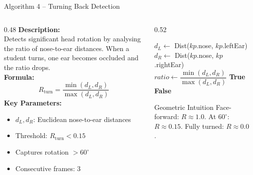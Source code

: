 \documentclass{beamer}
\begin{document}
\begin{frame}{Algorithm 4 -- Turning Back Detection}
\begin{columns}
\begin{column}{0.48\textwidth}
\footnotesize
\textbf{Description:}\\
Detects significant head rotation by analysing the ratio of nose-to-ear distances. When a student turns, one ear becomes occluded and the ratio drops.\\[0.3cm]
\textbf{Formula:}
\[
R_{\text{turn}} = \frac{\min(d_L, d_R)}{\max(d_L, d_R)}
\]
\textbf{Key Parameters:}
\begin{itemize}\footnotesize
    \item $d_L, d_R$: Euclidean nose-to-ear distances
    \item Threshold: $R_{\text{turn}} < 0.15$
    \item Captures rotation $> 60^\circ$
    \item Consecutive frames: 3
\end{itemize}
\end{column}
\begin{column}{0.52\textwidth}
\begin{algorithmic}[1]
\footnotesize
{}
  \State $d_L \gets$ Dist($kp$.nose, $kp$.leftEar)
  \State $d_R \gets$ Dist($kp$.nose, $kp$.rightEar)
  \State $ratio \gets \dfrac{\min(d_L,d_R)}{\max(d_L,d_R)}$
    \State \Return \textbf{True}
  \EndIf
  \State \Return \textbf{False}
\EndFunction
\end{algorithmic}
\vspace{0.4cm}
\begin{block}{\footnotesize Geometric Intuition}
\footnotesize Face-forward: $R \approx 1.0$. At $60^\circ$: $R \approx 0.15$. Fully turned: $R \approx 0.0$.
\end{block}
\end{column}
\end{columns}
\end{frame}
\end{document}
